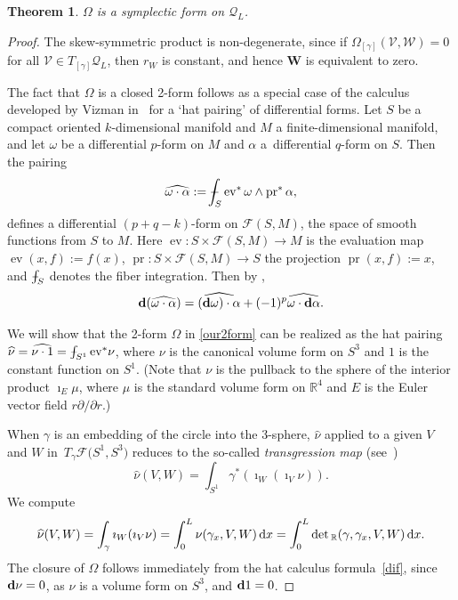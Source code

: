 \documentclass[10pt,a4paper]{amsart}
\def\Xint#1{\mathchoice
{\XXint\displaystyle\textstyle{#1}}%
{\XXint\textstyle\scriptstyle{#1}}%
{\XXint\scriptstyle\scriptscriptstyle{#1}}%
{\XXint\scriptscriptstyle\scriptscriptstyle{#1}}%
\!\int}
\def\XXint#1#2#3{{\setbox0=\hbox{$#1{#2#3}{\int}$ }
\vcenter{\hbox{$#2#3$ }}\kern-.6\wd0}}
\def\dashint{\Xint-}
\newcommand\Legq{\mathcal Q}
\newcommand\VW{\mathbf W}
\newcommand\qV{\mathcal V}%
\newcommand\qW{\mathcal W}
\newcommand{\dx}{\,{\rm d}x}
\def\gam{\gamma} %
\def\di{\partial}
\def\R{\mathbb R}
\numberwithin{equation}{section}
\newtheorem{Theorem}{Theorem}[section]
\begin{document}
\begin{Theorem} $\Omega$ is a symplectic form on $\Legq_L$.
\end{Theorem}
\begin{proof}
The skew-symmetric product is non-degenerate, since
if $\Omega_{[\gamma]}(\qV, \qW) = 0$
for all $\qV \in T_{[\gamma]} \Legq_L$, then $r_W$ is constant, and hence $\VW$ is equivalent to zero.

\newcommand{\ev}{\operatorname{ev}}
\newcommand{\pr}{\operatorname{pr}}
The fact that $\Omega$ is a closed 2-form follows as a special case of the calculus developed by Vizman in~\cite{V11} for a `hat pairing' of differential forms. Let $S$ be a compact oriented $k$-dimensional manifold and $M$ a finite-dimensional manifold, and let $\omega$ be a differential $p$-form on $M$ and $\alpha$ a~differential $q$-form on $S$. Then the pairing
\begin{equation*}
\widehat{\omega \cdot \alpha}:=\dashint_S \ev^* \omega \wedge \pr^* \alpha,
\end{equation*}
defines a differential $(p+q-k)$-form on $\mathcal{F}(S,M)$, the space of smooth functions from $S$ to $M$. Here $\ev\colon S \times \mathcal{F}(S,M) \rightarrow M$ is the evaluation map $\ev(x, f):=f(x)$, $\pr\colon S \times \mathcal{F}(S,M) \rightarrow S$ the projection
 $\pr(x, f):=x$, and $\dashint_S$ denotes the fiber integration. Then by \cite[Theorem 1]{V11},
 \begin{equation}
 \label{dif}
 {\bf{d}}(\widehat{\omega \cdot \alpha})=\widehat{({\bf d} \omega) \cdot \alpha}+(-1)^p \widehat{\omega \cdot {\bf d} \alpha}.
 \end{equation}



We will show that the 2-form $\Omega$ in \eqref{our2form} can be realized as the hat pairing $\widehat\nu =\widehat{\nu \cdot 1}=\dashint_{S^1} {\rm ev}^* \nu$, where $\nu$ is the canonical volume form on $S^3$ and $1$ is the constant function on $S^1$. \big(Note that $\nu$ is the pullback to the sphere of the interior product $\imath_E \mu$, where $\mu$ is the standard volume form on $\R^4$ and $E$ is the Euler vector field $r\di/\di r$.\big)


When $\gam$ is an embedding of the circle into the 3-sphere, $\widehat\nu$ applied to a
given $V$ and $W$ in~$T_\gamma \mathcal{F}\bigl(S^1, S^3\bigr)$ reduces to the so-called {\em transgression map} (see~\cite{V11})
\[
\widehat\nu (V, W)=\int_{S^1}\gamma^*(\imath_W (\imath_V \nu) ).
\]
We compute
\[
\widehat\nu (V, W)=\int_\gamma \imath_W (\imath_V\nu) =\int_0^L \nu (\gam_x, V, W) \dx=\int_0^L \det{}_\R( \gam, \gam_x, V, W) \dx.
\]
The closure of $\Omega$ follows immediately from the hat calculus formula~\eqref{dif}, since
${\bf d} \nu=0$, as $\nu$ is a volume form on $S^3$, and ${\bf d} 1=0$.
\end{proof}
\end{document}
